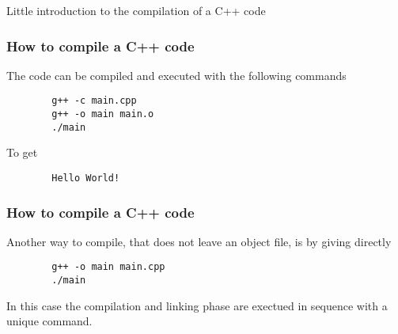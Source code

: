 \documentclass{beamer}
\begin{document}

\begin{frame}

    Little introduction to the compilation of a C++ code

\end{frame}




\begin{frame}[fragile]

    \frametitle{How to compile a C++ code}

    The code can be compiled and executed with the following commands

    \begin{verbatim}
        g++ -c main.cpp
        g++ -o main main.o
        ./main
    \end{verbatim}

    \vspace{.3cm}
    To get
    \begin{verbatim}
        Hello World!
    \end{verbatim}

\end{frame}


\begin{frame}[fragile]

    \frametitle{How to compile a C++ code}

    Another way to compile, that does not leave an object file, is by giving 
    directly
    \begin{verbatim}
        g++ -o main main.cpp
        ./main
    \end{verbatim}

    \vspace{.3cm}
    In this case the compilation and linking phase are exectued in sequence
    with a unique command.

\end{frame}
\end{document}
